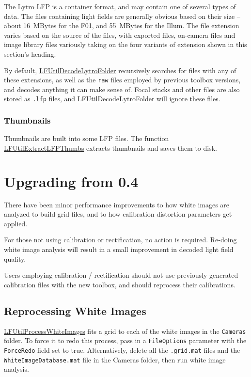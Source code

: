 \documentclass[onecolumn]{article}
\newcommand{\CiteFunc}[1]{\hyperlink{#1}{\small #1}}
\newcommand{\SymbolText}[1]{\texttt{\small #1}}
\begin{document}
\begin{appendices}
The Lytro LFP is a container format, and may contain one of several types of data.  The files containing light fields are generally obvious based on their size -- about 16~MBytes for the F01, and 55~MBytes for the Illum.  The file extension varies based on the source of the files, with exported files, on-camera files and image library files variously taking on the four variants of extension shown in this section's heading.  

By default, \CiteFunc{LFUtilDecodeLytroFolder} recursively searches for files with any of these extensions, as well as the \SymbolText{raw} files employed by previous toolbox versions, and decodes anything it can make sense of.  Focal stacks and other files are also stored as \SymbolText{.lfp} files, and \CiteFunc{LFUtilDecodeLytroFolder} will ignore these files.


\subsubsection{Thumbnails}

Thumbnails are built into some LFP files.  The function \CiteFunc{LFUtilExtractLFPThumbs} extracts thumbnails and saves them to disk.



\newpage
\section{Upgrading from 0.4}
\label{sect_Upgrading}

There have been minor performance improvements to how white images are analyzed to build grid files, and to how calibration distortion parameters get applied.

For those not using calibration or rectification, no action is required. Re-doing white image analysis will result in a small improvement in decoded light field quality.

Users employing calibration / rectification should not use previously generated calibration files with the new toolbox, and should reprocess their calibrations.

\subsection{Reprocessing White Images}
\CiteFunc{LFUtilProcessWhiteImages} fits a grid to each of the white images in the \SymbolText{Cameras} folder. To force it to redo this process, pass in a \SymbolText{FileOptions} parameter with the \SymbolText{ForceRedo} field set to true. Alternatively, delete all the \SymbolText{.grid.mat} files and the \SymbolText{WhiteImageDatabase.mat} file in the Cameras folder, then run white image analysis.


\end{appendices}
\end{document}
